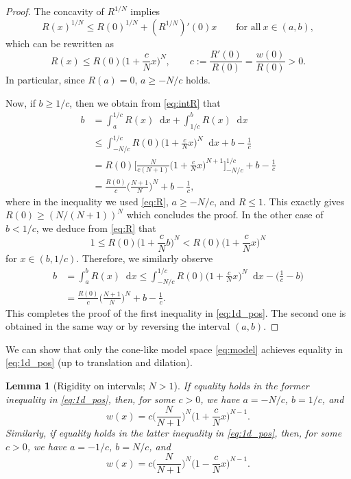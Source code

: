 \documentclass[sts]{imsart}
\newtheorem{lemma}[theorem]{Lemma}
\theoremstyle{definition}
\theoremstyle{remark}
\newcommand*\diff{\mathop{}\!\mathrm{d}}
\begin{document}
\begin{proof}
The concavity of $R^{1/N}$ implies
\[ R(x)^{1/N} \le R(0)^{1/N} +(R^{1/N})'(0) x
 \qquad \text{for all}\ x \in (a,b), \]
which can be rewritten as
\begin{equation}\label{eq:R}
R(x) \le R(0) \biggl( 1+\frac{c}{N}x \biggr)^N,
\qquad c:=\frac{R'(0)}{R(0)} =\frac{w(0)}{R(0)}>0.
\end{equation}
In particular, since $R(a)=0$, $a \ge -N/c$ holds.

Now, if $b \ge 1/c$, then we obtain from \eqref{eq:intR} that
\begin{align*}
b &= \int _a^{1/c} R(x)\diff x + \int_{1/c}^b R(x)\diff x\\
&\le \int_{-N/c}^{1/c} R(0)\biggl( 1+\frac{c}{N}x \biggr)^N \diff x + b-\frac{1}{c}\\
&= R(0) \Biggl[ \frac{N}{c(N+1)} \biggl( 1+\frac{c}{N}x \biggr)^{N+1} \Biggr]_{-N/c}^{1/c} + b -\frac{1}{c}\\
&= \frac{R(0)}{c} \biggl(\frac{N+1}{N}\biggr)^N +b-\frac{1}{c},
\end{align*}
where in the inequality we used \eqref{eq:R}, $a \ge -N/c$, and $R \le 1$.
This exactly gives $R(0) \geq (N/(N+1))^N$ which concludes the proof.
In the other case of $b<1/c$, we deduce from \eqref{eq:R} that
\[ 1 \le R(0) \biggl( 1+\frac{c}{N}b \biggr)^N
 < R(0) \biggl( 1+\frac{c}{N}x \biggr)^N \]
for $x \in (b,1/c)$.
Therefore, we similarly observe
\begin{align*}
b &= \int _a^b R(x)\diff x
 \leq \int_{-N/c}^{1/c} R(0)\biggl( 1+\frac{c}{N}x \biggr)^N \diff x - \biggl( \frac{1}{c} -b \biggr)\\
&= \frac{R(0)}{c} \biggl(\frac{N+1}{N}\biggr)^N +b-\frac{1}{c}.
\end{align*}
This completes the proof of the first inequality in \eqref{eq:1d_pos}.
The second one is obtained in the same way or by reversing the interval $(a,b)$.
\end{proof}

We can show that only the cone-like model space \eqref{eq:model} achieves equality in \eqref{eq:1d_pos} (up to translation and dilation).

\begin{lemma}[Rigidity on intervals; $N>1$]\label{lm:=_pos}
If equality holds in the former inequality in \eqref{eq:1d_pos}, then, for some $c>0$, we have $a=-N/c$, $b=1/c$, and
\begin{equation}\label{eq:=_pos}
w(x) =c \biggl( \frac{N}{N+1} \biggr)^N \biggl( 1+\frac{c}{N}x \biggr)^{N-1}.
\end{equation}
Similarly, if equality holds in the latter inequality in \eqref{eq:1d_pos}, then, for some $c>0$, we have $a=-1/c$, $b=N/c$, and
\[
w(x) =c \biggl( \frac{N}{N+1} \biggr)^N \biggl( 1-\frac{c}{N}x \biggr)^{N-1}.
\]
\end{lemma}
\end{document}
